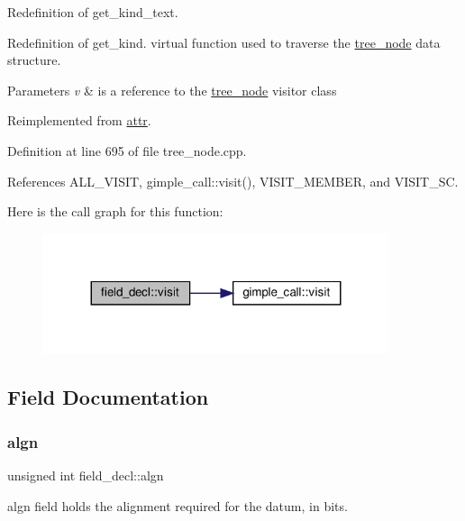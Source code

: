 Redefinition of get\+\_\+kind\+\_\+text. 

Redefinition of get\+\_\+kind. virtual function used to traverse the \hyperlink{classtree__node}{tree\+\_\+node} data structure. 
\begin{DoxyParams}{Parameters}
{\em v} & is a reference to the \hyperlink{classtree__node}{tree\+\_\+node} visitor class \\
\hline
\end{DoxyParams}


Reimplemented from \hyperlink{structattr_a75ba987f0d5d6b50e0aee15d25b98a5b}{attr}.



Definition at line 695 of file tree\+\_\+node.\+cpp.



References A\+L\+L\+\_\+\+V\+I\+S\+IT, gimple\+\_\+call\+::visit(), V\+I\+S\+I\+T\+\_\+\+M\+E\+M\+B\+ER, and V\+I\+S\+I\+T\+\_\+\+SC.

Here is the call graph for this function\+:
\nopagebreak
\begin{figure}[H]
\begin{center}
\leavevmode
\includegraphics[width=287pt]{d9/d49/structfield__decl_a68ef82bb50b2ebdaa89d1702aa01065e_cgraph}
\end{center}
\end{figure}


\subsection{Field Documentation}
\mbox{\label{structfield__decl_ad86e1af3e88ad5b7619263e870962585}} 
\subsubsection{\texorpdfstring{algn}{algn}}
{\footnotesize\ttfamily unsigned int field\+\_\+decl\+::algn}



algn field holds the alignment required for the datum, in bits. 

